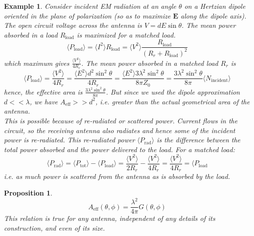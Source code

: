 \documentclass[a4paper]{article}
\newtheorem{eg}{Example}[section]
\theoremstyle{new}
\newtheorem{prop}{Proposition}[section]
\begin{document}
\begin{eg}
Consider incident EM radiation at an angle $\theta$ on a Hertzian dipole oriented in the plane of polarization (so as to maximize $\mathbf{E}$ along the dipole axis). The open circuit voltage across the antenna is $V=dE\sin\theta$. The mean power absorbed in a load $R_\text{load}$ is maximized for a matched load.
$$\langle P_{\text{load}}\rangle=\langle I^2\rangle R_{\text{load}}=\langle V^2\rangle\frac{R_{\text{load}}}{(R_r+R_{\text{load}})^2}$$
which maximum gives $\frac{\langle V^2\rangle}{4R_r}$. The mean power absorbed in a matched load $R_r$ is
$$\langle P_{\text{load}}\rangle=\frac{\langle V^2\rangle}{4R_r}=\frac{\langle E^2\rangle d^2\sin^2\theta}{4R_r}=\frac{\langle E^2\rangle 3\lambda^2\sin^2\theta}{8\pi Z_0}=\frac{3\lambda^2\sin^2\theta}{8\pi}\langle N_{\text{incident}}\rangle$$
hence, the effective area is $\frac{3\lambda^2\sin^2\theta}{8\pi}$. But since we used the dipole approximation $d<<\lambda$, we have $A_{\text{eff}}>>d^2$, i.e. greater than the actual geometrical area of the antenna.\\[5pt]
This is possible because of re-radiated or scattered power. Current flows in the circuit, so the receiving antenna also radiates and hence some of the incident power is re-radiated. This re-radiated power $\langle P_{\text{rad}}\rangle$ is the difference between the total power absorbed and the power delivered to the load. For a matched load:
$$\langle P_{\text{rad}}\rangle=\langle P_{\text{tot}}\rangle-\langle P_{\text{load}}\rangle=\frac{\langle V^2\rangle}{2R_r}-\frac{\langle V^2\rangle}{4R_r}=\frac{\langle V^2\rangle}{4R_r}=\langle P_{\text{load}}$$
i.e. as much power is scattered from the antenna as is absorbed by the load.
\end{eg}
\begin{prop}
$$A_{\text{eff}}(\theta,\phi)=\frac{\lambda^2}{4\pi}G(\theta,\phi)$$
This relation is true for any antenna, independent of any details of its construction, and even of its size.
\end{prop}
\end{document}
